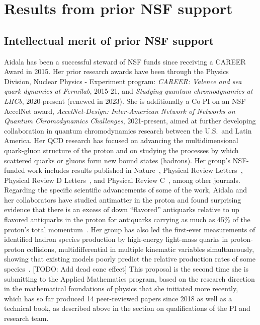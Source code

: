 \section{Results from prior NSF support}
\subsection{Intellectual merit of prior NSF support}

Aidala has been a successful steward of NSF funds since receiving a CAREER Award in 2015.  Her prior research awards have been through the Physics Division, Nuclear Physics - Experiment program: \emph{CAREER: Valence and sea quark dynamics at Fermilab}, 2015-21, and \emph{Studying quantum chromodynamics at LHCb}, 2020-present (renewed in 2023).  She is additionally a Co-PI on an NSF AccelNet award, \emph{AccelNet-Design: Inter-American Network of Networks on Quantum Chromodynamics Challenges}, 2021-present, aimed at further developing collaboration in quantum chromodynamics research between the U.S.~and Latin America.  Her QCD research has focused on advancing the multidimensional quark-gluon structure of the proton and on studying the processes by which scattered quarks or gluons form new bound states (hadrons).  Her group's NSF-funded work includes results published in Nature~\cite{SeaQuest:2021zxb}, Physical Review Letters~\cite{LHCb:2022tbc,LHCb:2019qoc}, Physical Review D Letters~\cite{LHCb:2022rky}, and Physical Review C~\cite{SeaQuest:2022xdu}, among other journals.  Regarding the specific scientific advancements of some of the work, Aidala and her collaborators have studied antimatter in the proton and found surprising evidence that there is an excess of down ``flavored'' antiquarks relative to up flavored antiquarks in the proton for antiquarks carrying as much as 45\% of the proton's total momentum~\cite{SeaQuest:2021zxb,SeaQuest:2022xdu}.  Her group has also led the first-ever measurements of identified hadron species production by high-energy light-mass quarks in proton-proton collisions, multidifferential in multiple kinematic variables simultaneously, showing that existing models poorly predict the relative production rates of some species~\cite{LHCb:2022rky}. [TODO: Add dead cone effect] This proposal is the second time she is submitting to the Applied Mathematics program, based on the research direction in the mathematical foundations of physics that she initiated more recently, which has so far produced 14 peer-reviewed papers since 2018 as well as a technical book, as described above in the section on qualifications of the PI and research team.  \\


